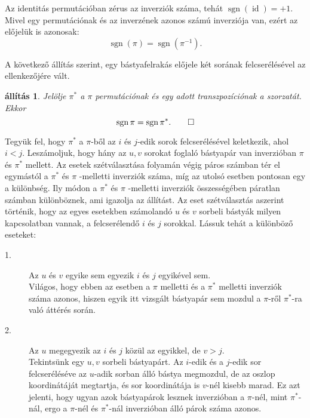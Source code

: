 \documentclass[9pt, a4paper, showtrims]{memoir}
\makeatletter
\renewenvironment{proof}[1][\proofname]
    {\par\pushQED{\qed}%
    \normalfont \topsep6\p@\@plus6\p@\relax
    \trivlist
    \item[\hskip\labelsep
        \itshape
    #1\@addpunct{:}]\ignorespaces}
    {\popQED\endtrivlist\@endpefalse}
\theoremstyle{plain}
\newtheorem{proposition}{állítás}[chapter]
\theoremstyle{remark}
\theoremstyle{definition}
\DeclareMathOperator{\sgn}{sgn}
\DeclareMathOperator{\id}{id}
\makeatother
\begin{document}
Az identitás permutációban zérus az inverziók száma, 
tehát $\sgn(\id)=+1$.
Mivel egy permutációnak és az inverzének azonos számú inverziója van, 
ezért az előjelük is azonosak:
\[
    \sgn\left( \pi \right)=\sgn\left( \pi^{-1} \right).
\]

A következő állítás szerint, 
egy bástyafelrakás előjele két sorának felcserélésével az ellenkezőjére vált.
\begin{proposition}
    Jelölje $\pi^\ast$ a $\pi$ permutációnak és egy adott transzpozíciónak a szorzatát.
    Ekkor 
    \[\sgn \pi=\sgn\pi^\ast.\qedhere
    \]
\end{proposition}
\begin{proof}
    Tegyük fel, 
    hogy $\pi^\ast$ a $\pi$-ből az $i$ és $j$-edik sorok felcserélésével keletkezik, 
    ahol  $i<j$.
    Leszámoljuk, 
    hogy hány az $u,v$ sorokat foglaló bástyapár van inverzióban $\pi$ és $\pi^\ast$ mellett.
    Az esetek szétválasztása folyamán végig páros számban tér el egymástól  a $\pi ^{\ast }$ és $\pi $ -melletti
    inverziók száma, 
    míg az utolsó esetben pontosan egy a különbség. 
    Ily módon a $\pi ^{\ast }$ és $\pi$ -melletti inverziók összességében páratlan számban különböznek,
    ami igazolja az állítást. 
    Az eset szétválasztás aszerint történik, hogy az egyes esetekben számolandó $u$ és $v$ sorbeli bástyák
    milyen kapcsolatban vannak, 
    a felcserélendő $i$ és $j$ sorokkal.
    Lássuk tehát a különböző eseteket:

    \begin{description}
    \item[1.]  Az $u$ és $v$ egyike sem egyezik $i$ és $j$ egyikével sem.\\
        Világos, hogy ebben az esetben a $\pi $ melletti és a $\pi ^{\ast }$ melletti
        inverziók száma azonos, hiszen egyik itt vizsgált bástyapár sem mozdul a $\pi$-ről $\pi^\ast$-ra
        való áttérés során.

    \item[2.]  Az $u$ megegyezik az $i$ és $j$ közül az egyikkel, de $v>j.$\\
        Tekintsünk egy $u,v$ sorbeli bástyapárt.
        Az $i$-edik és a $j$-edik sor felcseréléséve az $u$-adik sorban álló bástya megmozdul, 
        de az oszlop koordinátáját megtartja, és sor koordinátája is $v$-nél kisebb marad.
        Ez azt jelenti, 
        hogy ugyan azok bástyapárok lesznek inverzióban a $\pi$-nél, mint $\pi^\ast$-nál, ergo a 
        $\pi$-nél és $\pi^\ast$-nál inverzióban álló párok száma azonos.


\end{description}
\end{proof}
\end{document}
